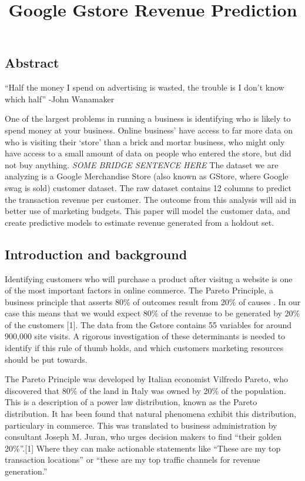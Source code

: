 \documentclass[]{tufte-handout}
\title{Google Gstore Revenue Prediction}
\date{}
\begin{document}
\maketitle




\hypertarget{abstract}{%
\subsection{Abstract}\label{abstract}}

``Half the money I spend on advertising is wasted, the trouble is I
don't know which half'' -John Wanamaker

One of the largest problems in running a business is identifying who is
likely to spend money at your business. Online business' have access to
far more data on who is visiting their `store' than a brick and mortar
business, who might only have access to a small amount of data on people
who entered the store, but did not buy anything. \emph{SOME BRIDGE
SENTENCE HERE} The dataset we are analyzing is a Google Merchandise
Store (also known as GStore, where Google swag is sold) customer
dataset. The raw dataset contains 12 columns to predict the transaction
revenue per customer. The outcome from this analysis will aid in better
use of marketing budgets. This paper will model the customer data, and
create predictive models to estimate revenue generated from a holdout
set.

\hypertarget{introduction-and-background}{%
\subsection{Introduction and
background}\label{introduction-and-background}}

Identifying customers who will purchase a product after visitng a
website is one of the most important factors in online commerce. The
Pareto Principle, a business principle that asserts 80\% of outcomes
result from 20\% of causes . In our case this means that we would expect
80\% of the revenue to be generated by 20\% of the customers {[}1{]}.
The data from the Gstore contains 55 variables for around 900,000 site
visits. A rigorous investigation of these determinants is needed to
identify if this rule of thumb holds, and which customers marketing
resources should be put towards.

The Pareto Principle was developed by Italian economist Vilfredo Pareto,
who discovered that 80\% of the land in Italy was owned by 20\% of the
population. This is a description of a power law distribution, known as
the Pareto distribution. It has been found that natural phenomena
exhibit this distribution, particulary in commerce. This was translated
to business administration by consultant Joseph M. Juran, who urges
decision makers to find ``their golden 20\%''.{[}1{]} Where they can
make actionable statements like ``These are my top transaction
locations'' or ``these are my top traffic channels for revenue
generation.''
\end{document}
